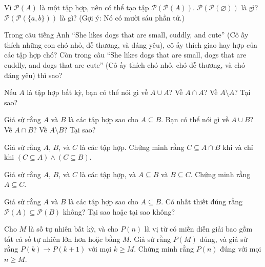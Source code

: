 \begin{exercise}
Vì $\mathcal{P}(A)$ là một tập hợp, nên có thể tạo tập $\mathcal{P}(\mathcal{P}(A))$. $\mathcal{P}(\mathcal{P}(\varnothing))$ là gì? $\mathcal{P}(\mathcal{P}(\{a, b\}))$ là gì? (Gợi ý: Nó có mười sáu phần tử.)
\end{exercise}

\begin{exercise}
Trong câu tiếng Anh ``She likes dogs that are small, cuddly, and cute'' (Cô ấy thích những con chó nhỏ, dễ thương, và đáng yêu), cô ấy thích giao hay hợp của các tập hợp chó? Còn trong câu ``She likes dogs that are small, dogs that are cuddly, and dogs that are cute'' (Cô ấy thích chó nhỏ, chó dễ thương, và chó đáng yêu) thì sao?
\end{exercise}

\begin{exercise}
Nếu $A$ là tập hợp bất kỳ, bạn có thể nói gì về $A \cup A$? Về $A \cap A$? Về $A \setminus A$? Tại sao?
\end{exercise}

\begin{exercise}
Giả sử rằng $A$ và $B$ là các tập hợp sao cho $A \subseteq B$. Bạn có thể nói gì về $A \cup B$? Về $A \cap B$? Về $A \setminus B$? Tại sao?
\end{exercise}

\begin{exercise}
Giả sử rằng $A$, $B$, và $C$ là các tập hợp. Chứng minh rằng $C \subseteq A \cap B$ khi và chỉ khi $(C \subseteq A) \land (C \subseteq B)$.
\end{exercise}

\begin{exercise}
Giả sử rằng $A$, $B$, và $C$ là các tập hợp, và $A \subseteq B$ và $B \subseteq C$. Chứng minh rằng $A \subseteq C$.
\end{exercise}

\begin{exercise}
Giả sử rằng $A$ và $B$ là các tập hợp sao cho $A \subseteq B$. Có nhất thiết đúng rằng $\mathcal{P}(A) \subseteq \mathcal{P}(B)$ không? Tại sao hoặc tại sao không?
\end{exercise}

\begin{exercise}
Cho $M$ là số tự nhiên bất kỳ, và cho $P(n)$ là vị từ có miền diễn giải bao gồm tất cả số tự nhiên lớn hơn hoặc bằng $M$. Giả sử rằng $P(M)$ đúng, và giả sử rằng $P(k) \to P(k+1)$ với mọi $k \geq M$. Chứng minh rằng $P(n)$ đúng với mọi $n \geq M$.
\end{exercise}

